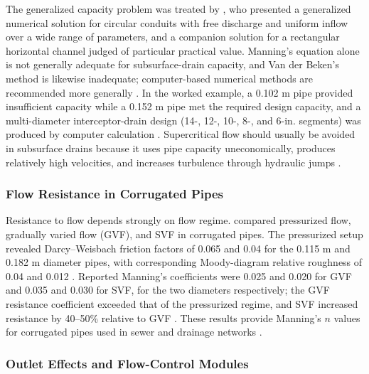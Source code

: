 \documentclass[11pt]{article}
\begin{document}
The generalized capacity problem was treated by \textcite{Graber2004}, who presented a
generalized numerical solution for circular conduits with free discharge and uniform
inflow over a wide range of parameters, and a companion solution for a rectangular
horizontal channel judged of particular practical value. Manning's equation alone is not
generally adequate for subsurface-drain capacity, and Van der Beken's method is likewise
inadequate; computer-based numerical methods are recommended more generally
\parencite{Graber2004}. In the worked example, a 0.102 m pipe provided insufficient
capacity while a 0.152 m pipe met the required design capacity, and a multi-diameter
interceptor-drain design (14-, 12-, 10-, 8-, and 6-in. segments) was produced by computer
calculation \parencite{Graber2004}. Supercritical flow should usually be avoided in
subsurface drains because it uses pipe capacity uneconomically, produces relatively high
velocities, and increases turbulence through hydraulic jumps \parencite{Graber2004}.

\subsubsection{Flow Resistance in Corrugated Pipes}

Resistance to flow depends strongly on flow regime. \textcite{Kouchakzadeh2011} compared
pressurized flow, gradually varied flow (GVF), and SVF in corrugated pipes. The pressurized
setup revealed Darcy--Weisbach friction factors of 0.065 and 0.04 for the 0.115 m and
0.182 m diameter pipes, with corresponding Moody-diagram relative roughness of 0.04 and
0.012 \parencite{Kouchakzadeh2011}. Reported Manning's coefficients were 0.025 and 0.020
for GVF and 0.035 and 0.030 for SVF, for the two diameters respectively; the GVF resistance
coefficient exceeded that of the pressurized regime, and SVF increased resistance by
40--50\% relative to GVF \parencite{Kouchakzadeh2011}. These results provide Manning's $n$
values for corrugated pipes used in sewer and drainage networks \parencite{Kouchakzadeh2011}.

\subsubsection{Outlet Effects and Flow-Control Modules}
\end{document}
